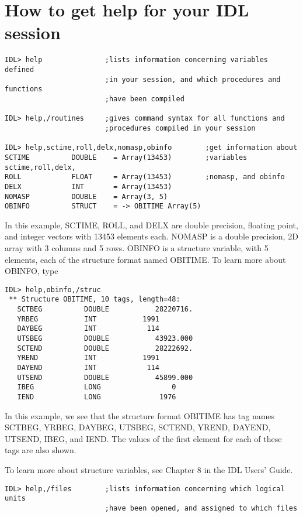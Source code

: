 \section{How to get help for your IDL session}

\medskip\noindent
\begin{verbatim}
IDL> help               ;lists information concerning variables defined
                        ;in your session, and which procedures and functions
                        ;have been compiled
 
IDL> help,/routines     ;gives command syntax for all functions and
                        ;procedures compiled in your session
 
IDL> help,sctime,roll,delx,nomasp,obinfo        ;get information about
SCTIME          DOUBLE    = Array(13453)        ;variables sctime,roll,delx,
ROLL            FLOAT     = Array(13453)        ;nomasp, and obinfo
DELX            INT       = Array(13453)
NOMASP          DOUBLE    = Array(3, 5)
OBINFO          STRUCT    = -> OBITIME Array(5)
\end{verbatim}
In this example, SCTIME, ROLL, and DELX are double precision, floating point,
and integer vectors with 13453 elements each. NOMASP is a double precision, 2D
array with 3 columns and 5 rows. OBINFO is a structure variable, with 5
elements, each of the structure format named OBITIME. To learn more about
OBINFO, type

\medskip\noindent
\begin{verbatim}
IDL> help,obinfo,/struc
 ** Structure OBITIME, 10 tags, length=48:
   SCTBEG          DOUBLE           28220716.
   YRBEG           INT           1991
   DAYBEG          INT            114
   UTSBEG          DOUBLE           43923.000
   SCTEND          DOUBLE           28222692.
   YREND           INT           1991
   DAYEND          INT            114
   UTSEND          DOUBLE           45899.000
   IBEG            LONG                 0
   IEND            LONG              1976
\end{verbatim}
In this example, we see that the structure format OBITIME has tag names SCTBEG,
YRBEG, DAYBEG, UTSBEG, SCTEND, YREND, DAYEND, UTSEND, IBEG, and IEND. The
values of the first element for each of these tags are also shown.
 
To learn more about structure variables, see Chapter 8 in the IDL Users' Guide.

\medskip\noindent
\begin{verbatim}
IDL> help,/files        ;lists information concerning which logical units
                        ;have been opened, and assigned to which files
\end{verbatim}
 
